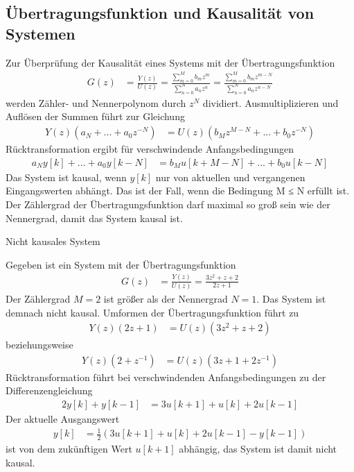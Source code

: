 \subsection{Übertragungsfunktion und Kausalität von Systemen}\label{sec:uxfcbertragungsfunktion-und-kausalituxe4t-von-systemen}

Zur Überprüfung der Kausalität eines Systems mit der Übertragungsfunktion
\begin{align}
G(z) &= \frac{Y(z)}{U(z)} = \frac{\sum\limits_{m = 0}^{M}{b_{m}  z^{m}}}{\sum\limits_{n = 0}^{N}{a_{n}  z^{n}}} = \frac{\sum\limits_{m = 0}^{M}{b_{m}  z^{m - N}}}{\sum\limits_{n = 0}^{N}{a_{n}  z^{n - N}}} \label{eq:6.79}
\end{align}
werden Zähler- und Nennerpolynom durch \(z^{N}\) dividiert. Ausmultiplizieren und Auflösen der Summen führt zur Gleichung
\begin{align}
Y(z)  \left( a_{N} + ... + a_{0}  z^{- N} \right) &= U(z)  \left( b_{M}  z^{M - N} + ... + b_{0}  z^{- N} \right) \label{eq:6.80}
\end{align}
Rücktransformation ergibt für verschwindende Anfangsbedingungen
\begin{align}
a_{N}  y[ k] + ... + a_{0}  y[ k - N] &= b_{M}  u[ k + M - N] + ... + b_{0}  u[ k - N] \label{eq:6.81}
\end{align}
Das System ist kausal, wenn \(y[k]\) nur von aktuellen und vergangenen Eingangswerten abhängt. Das ist der Fall, wenn die Bedingung M ≤ N erfüllt ist. Der Zählergrad der Übertragungsfunktion darf maximal so groß sein wie der Nennergrad, damit das System kausal ist.

\begin{example}{Nicht kausales System}
\label{example:beispiel-nicht-kausales-system}

Gegeben ist ein System mit der Übertragungsfunktion
\begin{align*}
G(z) &= \frac{Y(z)}{U(z)} = \frac{3  z^{2} + z + 2}{2  z + 1} 
\end{align*}
Der Zählergrad \(M = 2\) ist größer als der Nennergrad \(N = 1\). Das System ist demnach nicht kausal. Umformen der Übertragungsfunktion führt zu
\begin{align*}
Y(z)  (2  z + 1) &= U(z)  \left( 3  z^{2} + z + 2 \right) 
\end{align*}
beziehungsweise
\begin{align*}
Y(z)  \left( 2 + z^{- 1} \right) &= U(z)  \left( 3  z + 1 + 2  z^{- 1} \right) 
\end{align*}
Rücktransformation führt bei verschwindenden Anfangsbedingungen zu der Differenzengleichung
\begin{align*}
2  y[ k] + y[ k - 1] &= 3  u[ k + 1] + u[ k] + 2  u[ k - 1] 
\end{align*}
Der aktuelle Ausgangswert
\begin{align*}
y[ k] &= \frac{1}{2}  \left( 3  u[ k + 1] + u[ k] + 2  u[ k - 1] - y[ k - 1] \right) 
\end{align*}
ist von dem zukünftigen Wert \(u[k+1]\) abhängig, das System ist damit nicht kausal.

\end{example}

